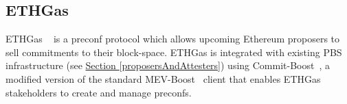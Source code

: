 \documentclass[a4paper]{article}
\theoremstyle{boldstyle}
\begin{document}
            
            



        
   

        \subsection{ \textbf{ETHGas}}
        ETHGas ~\cite{W:IntroducingETHGasandRealtimeProposerCommitmentstotheLidoCommunity,W:ETHGasDocs-Overview} is a preconf protocol which allows upcoming Ethereum proposers to sell commitments to their block-space. ETHGas is integrated with existing PBS infrastructure (see \hyperref[proposersAndAttesters]{Section \ref{proposersAndAttesters}}) using Commit-Boost~\cite{W:ETHGaspreconfcommit-boostmodule}, a modified version of the standard MEV-Boost~\cite{MEV-Boost} client that enables ETHGas stakeholders to create and manage preconfs.
\end{document}
